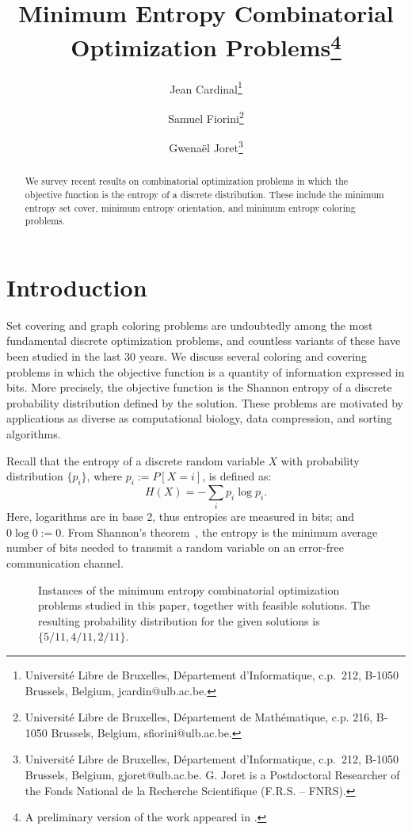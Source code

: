 \documentclass[10pt,a4paper]{article}
\title{Minimum Entropy Combinatorial Optimization Problems\footnote{
A preliminary version of the work appeared in \cite{CiE}.
}}
\author{
Jean Cardinal\thanks{Universit\'e Libre de Bruxelles, D\'epartement d'Informatique, c.p.~212, B-1050 Brussels, Belgium, jcardin@ulb.ac.be.}
 \and 
Samuel Fiorini\thanks{Universit\'e Libre de Bruxelles, D\'epartement de Math\'ematique, c.p. 216,  B-1050 Brussels, Belgium,  sfiorini@ulb.ac.be.}
\and 
Gwena\"el Joret\thanks{Universit\'e Libre de Bruxelles, D\'epartement d'Informatique, c.p.~212,  B-1050 Brussels, Belgium, gjoret@ulb.ac.be. G. Joret is a Postdoctoral Researcher of the Fonds National de la Recherche Scientifique (F.R.S. -- FNRS).}
}
\date{}
\begin{document}
\maketitle
\sloppy

\begin{abstract}
We survey recent results on combinatorial optimization problems in which the objective function is the entropy of a discrete distribution.
These include the minimum entropy set cover, minimum entropy orientation, and minimum entropy coloring problems. 
\end{abstract}

\section{Introduction}

Set covering and graph coloring problems are undoubtedly among the most fundamental discrete optimization problems, and countless variants of these have been studied in the last 30 years. We discuss several coloring and covering problems in which the objective function is a quantity of information expressed in bits. More precisely, the objective function is the Shannon entropy of a discrete probability distribution defined by the solution. These problems are motivated by applications as diverse as computational biology, data compression, and sorting algorithms.\medskip

Recall that the entropy of a discrete random variable $X$ with probability distribution $\{p_i\}$, where $p_i := P[X=i]$, is defined as:
$$
H(X)= - \sum_i p_i \log p_i.
$$
Here, logarithms are in base 2, thus entropies are measured in bits; and $0\log 0 := 0$. From Shannon's theorem~\cite{Shanno48}, the entropy is the minimum average number of bits needed to transmit a random variable on an error-free communication channel.\medskip

\begin{figure}[t]
\begin{center}
 \hspace{1cm} 
 \hspace{1cm}
 \hspace{1cm}
\end{center}
\caption{\label{fig:ex}Instances of the minimum entropy combinatorial optimization problems studied in this paper, together
with feasible solutions. The resulting probability distribution for the given solutions is $\{ 5/11, 4/11, 2/11 \}$.}
\end{figure}
\end{document}
